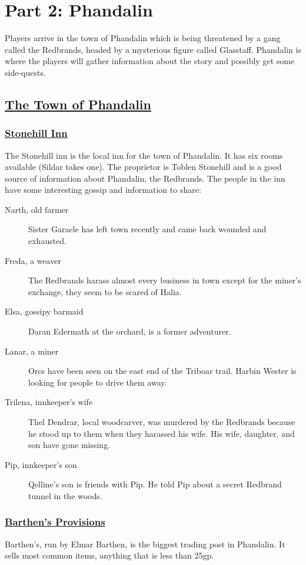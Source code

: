 \section{Part 2: Phandalin}
Players arrive in the town of Phandalin which is being threatened by a gang called the Redbrands, headed by a mysterious figure called Glasstaff. Phandalin is where the players will gather information about the story and possibly get some side-quests.

\subsection{\underline{The Town of Phandalin}}

\subsubsection*{\underline{Stonehill Inn}}
The Stonehill inn is the local inn for the town of Phandalin. It has six rooms available (Sildar takes one). The proprietor is Toblen Stonehill and is a good source of information about Phandalin, the Redbrands. The people in the inn have some interesting gossip and information to share:

\begin{description}	
	\item[Narth, old farmer] Sister Garaele has left town recently and came back wounded and exhausted.
	\item[Freda, a weaver] The Redbrands harass almost every business in town except for the miner's exchange, they seem to be scared of Halia.
	\item[Elsa, gossipy barmaid] Daran Edermath at the orchard, is a former adventurer.
	\item[Lanar, a miner] Orcs have been seen on the east end of the Triboar trail. Harbin Wester is looking for people to drive them away.
	\item[Trilena, innkeeper's wife] Thel Dendrar, local woodcarver, was murdered by the Redbrands because he stood up to them when they harassed his wife. His wife, daughter, and son have gone missing.
	\item[Pip, innkeeper's son] Qelline's son is friends with Pip. He told Pip about a secret Redbrand tunnel in the woods.
\end{description}

\subsubsection*{\underline{Barthen's Provisions}}
Barthen's, run by Elmar Barthen, is the biggest trading post in Phandalin. It sells most common items, anything that is less than 25gp.

